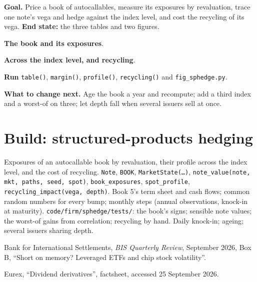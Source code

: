 \begin{tutorial}
\textbf{Goal.} Price a book of autocallables, measure its exposures by revaluation, trace one note's vega and hedge against the index level, and cost
the recycling of its vega. \textbf{End state:} the three tables and two figures.
\begin{tutsteps}
\item \textbf{The book and its exposures}.
\label{lst:s2:hedging-a-structured-products-book:book}
\item \textbf{Across the index level, and recycling}.
\label{lst:s2:hedging-a-structured-products-book:profile}
\item \textbf{Run} \texttt{table()}, \texttt{margin()}, \texttt{profile()}, \texttt{recycling()} and \texttt{fig\_sphedge.py}.
\end{tutsteps}
\textbf{What to change next.} Age the book a year and recompute; add a third index and a worst-of on three; let depth fall when several issuers sell
at once.
\end{tutorial}

\section{Build: structured-products hedging}\label{bld:s2:hedging-a-structured-products-book:sphedge}

\begin{build}
 Exposures of an autocallable book by revaluation, their profile across the index level, and the cost of recycling.
 \texttt{Note}, \texttt{BOOK}, \texttt{MarketState(\dots)}, \texttt{note\_value(note, mkt, paths, seed, spot)},
\texttt{book\_exposures}, \texttt{spot\_profile}, \texttt{recycling\_impact(vega, depth)}.
 Book 5's term sheet and cash flows; common random numbers for every bump; monthly steps (annual observations, knock-in at maturity).
 \texttt{code/firm/sphedge/tests/}: the book's signs; sensible note values; the worst-of gains from correlation; recycling
by hand.
 Daily knock-in; ageing; several issuers sharing depth.
\end{build}

\begin{omsources}
\item Bank for International Settlements, \emph{BIS Quarterly Review}, September 2026, Box B, ``Short on memory? Leveraged ETFs and chip stock
volatility''.
\item Eurex, ``Dividend derivatives'', factsheet, accessed 25 September 2026.
\end{omsources}

